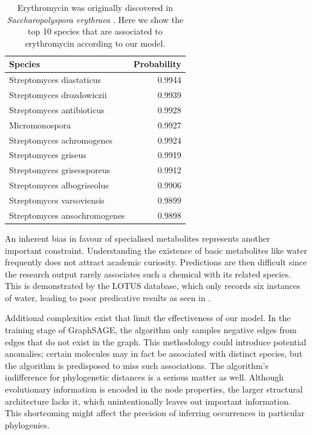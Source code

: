 \documentclass[
11pt, %
oneside, %
english, %
singlespacing, %
headsepline, %
chapterinoneline, %
]{MastersDoctoralThesis} %
\begin{document}
\begin{table}[h]
	\centering
	\caption{Erythromycin was originally discovered in \textit{Saccharopolyspora erythraea } \cite{beranIsolationErythromycinNoxide1991}. Here we show the top 10 species that are associated to erythromycin according to our model.}
	\begin{tabular}{lr}
		\toprule
		Species & Probability \\
		\midrule
		Streptomyces diastaticus & 0.9944 \\
		Streptomyces drozdowiczii & 0.9939 \\
		Streptomyces antibioticus & 0.9928 \\
		Micromonospora & 0.9927 \\
		Streptomyces achromogenes & 0.9924 \\
		Streptomyces griseus & 0.9919 \\
		Streptomyces griseosporeus & 0.9912 \\
		Streptomyces albogriseolus & 0.9906 \\
		Streptomyces varsoviensis & 0.9899 \\
		Streptomyces ansochromogenes & 0.9898 \\
		\bottomrule
	\end{tabular}
	\label{table: Erythromycin top scores}
\end{table}

An inherent bias in favour of specialised metabolites represents another important constraint. Understanding the existence of basic metabolites like water frequently does not attract academic curiosity. Predictions are then difficult since the research output rarely associates such a chemical with its related species. This is demonstrated by the LOTUS database, which only records six instances of water, leading to poor predicative results as seen in .

Additional complexities exist that limit the effectiveness of our model. In the training stage of GraphSAGE, the algorithm only samples negative edges from edges that do not exist in the graph. This methodology could introduce potential anomalies; certain molecules may in fact be associated with distinct species, but the algorithm is predisposed to miss such associations. The algorithm's indifference for phylogenetic distances is a serious matter as well. Although evolutionary information is encoded in the node properties, the larger structural architecture lacks it, which unintentionally leaves out important information. This shortcoming might affect the precision of inferring occurrences in particular phylogenies. 
\end{document}
